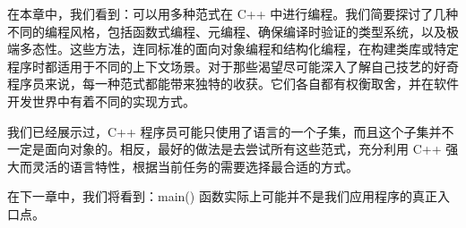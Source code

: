 在本章中，我们看到：可以用多种范式在 C++ 中进行编程。我们简要探讨了几种不同的编程风格，包括函数式编程、元编程、确保编译时验证的类型系统，以及极端多态性。这些方法，连同标准的面向对象编程和结构化编程，在构建类库或特定程序时都适用于不同的上下文场景。对于那些渴望尽可能深入了解自己技艺的好奇程序员来说，每一种范式都能带来独特的收获。它们各自都有权衡取舍，并在软件开发世界中有着不同的实现方式。

我们已经展示过，C++ 程序员可能只使用了语言的一个子集，而且这个子集并不一定是面向对象的。相反，最好的做法是去尝试所有这些范式，充分利用 C++ 强大而灵活的语言特性，根据当前任务的需要选择最合适的方式。

在下一章中，我们将看到：main() 函数实际上可能并不是我们应用程序的真正入口点。